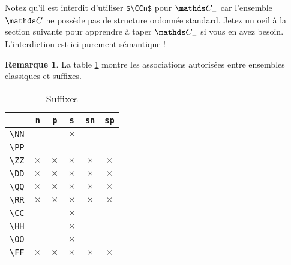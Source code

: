 \documentclass[12pt,a4paper]{article}
\newcommand\env[1]{\texttt{#1}}
\newcommand\macro[1]{\env{\textbackslash{}#1}}
\theoremstyle{definition}
\newtheorem*{remark}{Remarque}
\begin{document}
Notez qu'il est interdit d'utiliser \verb+$\CCn$+ pour $\setspecial{\CC}{n}$ car l'ensemble $\CC$ ne possède pas de structure ordonnée standard. Jetez un oeil à la section suivante pour apprendre à taper $\setspecial{\CC}{n}$ si vous en avez besoin. L'interdiction est ici purement sémantique !

\medskip

\begin{remark}
	La table \ref{table:suffixes-sets}  montre les associations autorisées entre ensembles classiques et suffixes.
\end{remark}


\begin{table}[h]
    \caption{Suffixes}
    \begin{center}
        \begin{tabular}{c|c|c|c|c|c}
              & \verb+n+ & \verb+p+ & \verb+s+ & \verb+sn+ & \verb+sp+ \\
            \hline \macro{NN} &          &          & $\times$ &          &          \\
            \hline \macro{PP} &          &          &          &          &          \\
            \hline \macro{ZZ} & $\times$ & $\times$ & $\times$ & $\times$ & $\times$ \\
            \hline \macro{DD} & $\times$ & $\times$ & $\times$ & $\times$ & $\times$ \\
            \hline \macro{QQ} & $\times$ & $\times$ & $\times$ & $\times$ & $\times$ \\
            \hline \macro{RR} & $\times$ & $\times$ & $\times$ & $\times$ & $\times$ \\
            \hline \macro{CC} &          &          & $\times$ &          &          \\
            \hline \macro{HH} &          &          & $\times$ &          &          \\
            \hline \macro{OO} &          &          & $\times$ &          &          \\
            \hline \macro{FF} & $\times$ & $\times$ & $\times$ & $\times$ & $\times$ \\
        \end{tabular}
    \end{center}
    \label{table:suffixes-sets}
\end{table}
\end{document}
